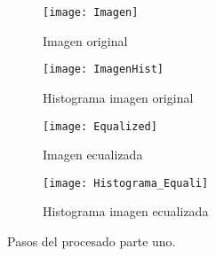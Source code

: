 \begin{figure}

	\begin{subfigure}[c]{.55\linewidth}
	\centering\large \texttt{[image: Imagen]}
	\caption{Imagen original}\label{fig:2.1.1}
	\end{subfigure}%
	\begin{subfigure}[c]{.55\linewidth}
	\centering\large \texttt{[image: ImagenHist]}
	\caption{Histograma imagen original}\label{fig:2.1.2}
	\end{subfigure}%
	
	\begin{subfigure}[c]{.55\linewidth}
	\centering\large \texttt{[image: Equalized]}
	\caption{Imagen ecualizada}\label{fig:2.1.3}
	\end{subfigure}%
	\begin{subfigure}[c]{.55\linewidth}
	\centering\large \texttt{[image: Histograma\_Equali]}
	\caption{Histograma imagen ecualizada}\label{fig:2.1.4}
	\end{subfigure}%
	\caption{Pasos del procesado parte uno.}\label{fig:2.1}

\end{figure}
 
	

